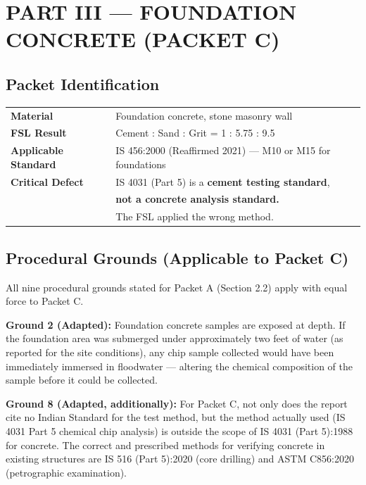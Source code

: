 \documentclass[12pt, a4paper]{article}
\begin{document}
\section{PART III --- FOUNDATION CONCRETE (PACKET C)}

\subsection{Packet Identification}

\begin{center}
\begin{tabular}{|l|l|}
  \hline
  \textbf{Material} & Foundation concrete, stone masonry wall \\
  \textbf{FSL Result} & Cement : Sand : Grit = 1 : 5.75 : 9.5 \\
  \textbf{Applicable Standard} & IS 456:2000 (Reaffirmed 2021) --- M10 or M15 for foundations \\
  \textbf{Critical Defect} & IS 4031 (Part 5) is a \textbf{cement testing standard},\\
                           & \textbf{not a concrete analysis standard.} \\
                           & The FSL applied the wrong method. \\
  \hline
\end{tabular}
\end{center}

\subsection{Procedural Grounds (Applicable to Packet C)}

All nine procedural grounds stated for Packet A (Section 2.2) apply with equal force to Packet C.

\textbf{Ground 2 (Adapted):} Foundation concrete samples are exposed at depth. If the foundation area was submerged under approximately two feet of water (as reported for the site conditions), any chip sample collected would have been immediately immersed in floodwater --- altering the chemical composition of the sample before it could be collected.

\textbf{Ground 8 (Adapted, additionally):} For Packet C, not only does the report cite no Indian Standard for the test method, but the method actually used (IS 4031 Part 5 chemical chip analysis) is outside the scope of IS 4031 (Part 5):1988 for concrete. The correct and prescribed methods for verifying concrete in existing structures are IS 516 (Part 5):2020 (core drilling) and ASTM C856:2020 (petrographic examination).
\end{document}
